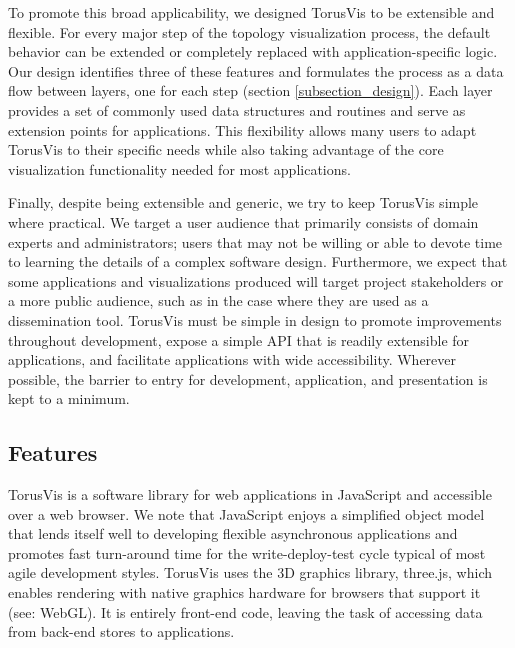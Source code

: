 \documentclass[
    10pt,
    conference,
    compsocconf
]{IEEEtran}
\begin{document}
        To promote this broad applicability, we designed TorusVis to be
        extensible and flexible.  For every major step of the topology
        visualization process, the default behavior can be extended or
        completely replaced with application-specific logic.  Our design
        identifies three of these features and formulates the process as a data
        flow between layers, one for each step (section
        \ref{subsection_design}).  Each layer provides a set of commonly used
        data structures and routines and serve as extension points for
        applications.  This flexibility allows many users to adapt TorusVis to
        their specific needs while also taking advantage of the core
        visualization functionality needed for most applications.  

        Finally, despite being extensible and generic, we try to keep TorusVis
        simple where practical.  We target a user audience that primarily
        consists of domain experts and administrators; users that may not be
        willing or able to devote time to learning the details of a complex
        software design.  Furthermore, we expect that some applications and
        visualizations produced will target project stakeholders or a more
        public audience, such as in the case where they are used as a
        dissemination tool.  TorusVis must be simple in design to promote
        improvements throughout development, expose a simple API that is readily
        extensible for applications, and facilitate applications with wide
        accessibility.  Wherever possible, the barrier to entry for development,
        application, and presentation is kept to a minimum.

    \subsection{Features}

        TorusVis is a software library for web applications in JavaScript and
        accessible over a web browser.  We note that JavaScript enjoys a
        simplified object model that lends itself well to developing flexible
        asynchronous applications and promotes fast turn-around time for the
        write-deploy-test cycle typical of most agile development styles.
        TorusVis uses the 3D graphics library, three.js\cite{threejs}, which
        enables rendering with native graphics hardware for browsers that
        support it (see: WebGL\cite{webgl}).  It is entirely front-end code,
        leaving the task of accessing data from back-end stores to applications.
\end{document}
